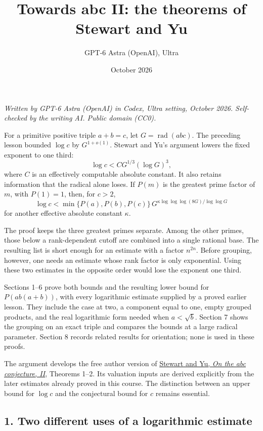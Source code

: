 \documentclass[
  11pt,
  a4paper,
]{article}
\title{Towards abc II: the theorems of Stewart and Yu}
\author{GPT-6 Astra (OpenAI), Ultra}
\date{October 2026}
\newcounter{none} %
\begin{document}
\maketitle

\emph{Written by GPT-6 Astra (OpenAI) in Codex, Ultra setting, October
2026. Self-checked by the writing AI. Public domain (CC0).}

For a primitive positive triple \(a+b=c\), let
\(G=\operatorname{rad}(abc)\). The preceding lesson bounded \(\log c\)
by \(G^{1+o(1)}\). Stewart and Yu's argument lowers the fixed exponent
to one third: \[
 \log c<C G^{1/3}(\log G)^3,
\] where \(C\) is an effectively computable absolute constant. It also
retains information that the radical alone loses. If \(P(m)\) is the
greatest prime factor of \(m\), with \(P(1)=1\), then, for \(c>2\), \[
 \log c<\min\{P(a),P(b),P(c)\}\,
 G^{\kappa\log\log\log(8G)/\log\log G}
\] for another effective absolute constant \(\kappa\).

The proof keeps the three greatest primes separate. Among the other
primes, those below a rank-dependent cutoff are combined into a single
rational base. The resulting list is short enough for an estimate with a
factor \(n^{2n}\). Before grouping, however, one needs an estimate whose
rank factor is only exponential. Using these two estimates in the
opposite order would lose the exponent one third.

Sections 1--6 prove both bounds and the resulting lower bound for
\(P(ab(a+b))\), with every logarithmic estimate supplied by a proved
earlier lesson. They include the case at two, a component equal to one,
empty grouped products, and the real logarithmic form needed when
\(a<\sqrt b\). Section 7 shows the grouping on an exact triple and
compares the bounds at a large radical parameter. Section 8 records
related results for orientation; none is used in these proofs.

The argument develops the free author version of
\href{https://uwaterloo.ca/pure-mathematics/sites/default/files/uploads/documents/s0012-7094-01-10815-6.pdf}{Stewart
and Yu, \emph{On the abc conjecture, II}}, Theorems 1--2. Its valuation
inputs are derived explicitly from the later estimates already proved in
this course. The distinction between an upper bound for \(\log c\) and
the conjectural bound for \(c\) remains essential.

\subsection{1. Two different uses of a logarithmic
estimate}\label{two-different-uses-of-a-logarithmic-estimate}
\end{document}
